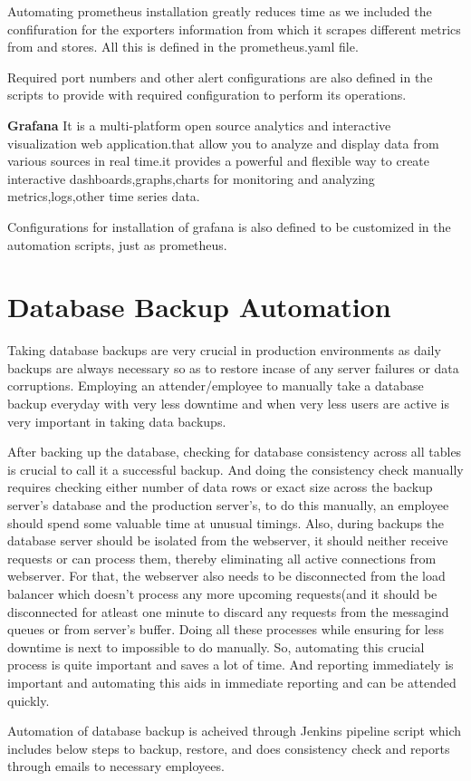 \documentclass[12pt,a4paper,oneside]{report}
\begin{document}
Automating prometheus installation greatly reduces time as we included the confifuration for the exporters information from which it scrapes different metrics from and stores. All this is defined in the prometheus.yaml file.

Required port numbers and other alert configurations are also defined in the scripts to provide with required configuration to perform its operations.

\hspace{1cm}\textbf{{\Large Grafana}}
It is a multi-platform open source analytics and interactive visualization web application.that allow you to analyze and display data from various sources in real time.it provides a powerful and flexible way to create interactive dashboards,graphs,charts for monitoring and analyzing metrics,logs,other time series data.

Configurations for installation of grafana is also defined to be customized in the automation scripts, just as prometheus.

\section{Database Backup Automation}
\par\hspace{1cm} Taking database backups are very crucial in production environments as daily backups are always necessary so as to restore incase of any server failures or data corruptions. Employing an attender/employee to manually take a database backup everyday with very less downtime and when very less users are active is very important in taking data backups. 

\par\hspace{1cm} After backing up the database, checking for database consistency across all tables is crucial to call it a successful backup. And doing the consistency check manually requires checking either number of data rows or exact size across the backup server's database and the production server's, to do this manually, an employee should spend some valuable time at unusual timings.  Also, during backups the database server should be isolated from the webserver, it should neither receive requests or can process them, thereby eliminating all active connections from webserver. For that, the webserver also needs to be disconnected from the load balancer which doesn't process any more upcoming requests(and it should be disconnected for atleast one minute to discard any requests from the messagind queues or from server's buffer. Doing all these processes while ensuring for less downtime is next to impossible to do manually. So, automating this crucial process is quite important and saves a lot of time. And reporting immediately is important and automating this aids in immediate reporting and can be attended quickly.
\par\hspace{1cm} Automation of database backup is acheived through Jenkins pipeline script which includes below steps to backup, restore, and does consistency check and reports through emails to necessary employees.
\end{document}
